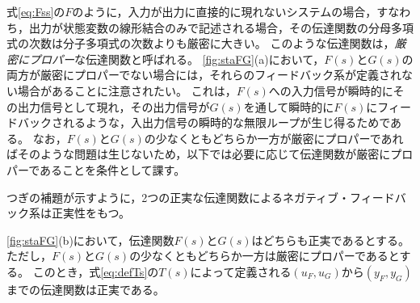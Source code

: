\documentclass[tombow,dvipdfmx]{corona-a5}
\begin{document}
式\ref{eq:Fss}の$F$のように，入力が出力に直接的に現れないシステムの場合，すなわち，出力が状態変数の線形結合のみで記述される場合，その伝達関数の分母多項式の次数は分子多項式の次数よりも厳密に大きい。
このような伝達関数は，\emph{厳密にプロパー}な伝達関数と呼ばれる。
\ref{fig:staFG}(a)において，$F(s)$と$G(s)$の両方が厳密にプロパーでない場合には，それらのフィードバック系が定義されない場合があることに注意されたい。
これは，$F(s)$への入力信号が瞬時的にその出力信号として現れ，その出力信号が$G(s)$を通して瞬時的に$F(s)$にフィードバックされるような，入出力信号の瞬時的な無限ループが生じ得るためである。
なお，$F(s)$と$G(s)$の少なくともどちらか一方が厳密にプロパーであればそのような問題は生じないため，以下では必要に応じて伝達関数が厳密にプロパーであることを条件として課す。

つぎの補題が示すように，2つの正実な伝達関数によるネガティブ・フィードバック系は正実性をもつ。


\begin{補題}[正実な伝達関数のフィードバック系]\label{lem:prpre}
\ref{fig:staFG}(b)において，伝達関数$F(s)$と$G(s)$はどちらも正実であるとする。
ただし，$F(s)$と$G(s)$の少なくともどちらか一方は厳密にプロパーであるとする。
このとき，式\ref{eq:defTs}の$T(s)$によって定義される$(u_F,u_G)$から$(y_F,y_G)$までの伝達関数は正実である。
\end{補題}
\end{document}
